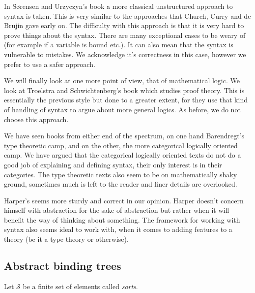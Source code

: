 In S{\o}rensen and Urzyczyn's book \cite{Sorensen} a more classical unstructured approach to syntax is taken. This is very similar to the approaches that Church, Curry and de Brujin gave early on. The difficulty with this approach is that it is very hard to prove things about the syntax. There are many exceptional cases to be weary of (for example if a variable is bound etc.). It can also mean that the syntax is vulnerable to mistakes. We acknowledge it's correctness in this case, however we prefer to use a safer approach.

We will finally look at one more point of view, that of mathematical logic. We look at Troelstra and Schwichtenberg's book \cite{troelstra_schwichtenberg_2000} which studies proof theory. This is essentially the previous style but done to a greater extent, for they use that kind of handling of syntax to argue about more general logics. As before, we do not choose this approach.

We have seen books from either end of the spectrum, on one hand Barendregt's type theoretic camp, and on the other, the more categorical logically oriented camp. We have argued that the categorical logically oriented texts do not do a good job of explaining and defining syntax, their only interest is in their categories. The type theoretic texts also seem to be on mathematically shaky ground, sometimes much is left to the reader and finer details are overlooked.

Harper's seems more sturdy and correct in our opinion. Harper doesn't concern himself with abstraction for the sake of abstraction but rather when it will benefit the way of thinking about something. The framework for working with syntax also seems ideal to work with, when it comes to adding features to a theory (be it a type theory or otherwise).

\subsection{Abstract binding trees}

\begin{defin}[Sorts]
    Let $\mathcal{S}$ be a finite set of elements called \emph{sorts}.
\end{defin}


